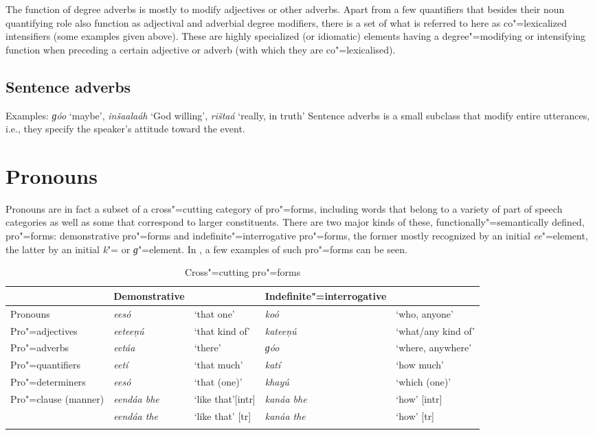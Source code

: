 The function of degree adverbs is mostly to modify adjectives or other adverbs. Apart from a few quantifiers that besides their noun quantifying role also function as adjectival and adverbial degree modifiers, there is a set of what is referred to here as co"=lexicalized intensifiers (some examples given above). These are highly specialized (or idiomatic) elements having a degree"=modifying or intensifying function when preceding a certain adjective or adverb (with which they are co"=lexicalised). 


\subsection{Sentence adverbs}
\label{subsec:3b-5-5}
Examples: \textit{ɡóo} `maybe', \textit{inšaalaáh} `God willing', \textit{rištaá} `really, in truth'
Sentence adverbs is a small subclass that modify entire utterances, i.e., they specify the speaker’s attitude toward the event.


\section{Pronouns}
\label{sec:3b-6}
Pronouns are in fact a subset of a cross"=cutting category of pro"=forms, including words that belong to a variety of part of speech categories as well as some that correspond to larger constituents. There are two major kinds of these, functionally"=semantically defined, pro"=forms: demonstrative pro"=forms and indefinite"=interrogative pro"=forms, the former mostly recognized by an initial \textit{ee}"=element, the latter by an initial \textit{k}"= or \textit{ɡ}"=element. In , a few examples of such pro"=forms can be seen.


\begin{table}[ht]
\caption{Cross"=cutting pro"=forms}
\begin{tabularx}{\textwidth}{ Q Q Q Q Q }
\lsptoprule
&
Demonstrative &
&
Indefinite"=interrogative &
\\\hline
Pronouns &
\textit{eesó} &
`that one' &
\textit{koó} &
`who, anyone'\\
Pro"=adjectives &
\textit{eeteeṇú} &
`that kind of' &
\textit{kateeṇú} &
`what/any kind of' \\
Pro"=adverbs &
\textit{eetáa} &
`there' &
\textit{ɡóo} &
`where, anywhere' \\
Pro"=quantifiers &
\textit{eetí} &
`that much' &
\textit{katí} &
`how much' \\
Pro"=determiners &
\textit{eesó} &
`that (one)' &
\textit{khayú} &
`which (one)' \\
Pro"=clause (manner) &
\textit{eendáa bhe} &
`like that'[intr] &
\textit{kanáa bhe} &
`how' [intr] \\
&
\textit{eendáa the} &
`like that' [tr] &
\textit{kanáa the} &
`how' [tr] \\\lspbottomrule
\end{tabularx}
\label{tab:3b-1}
\end{table}


